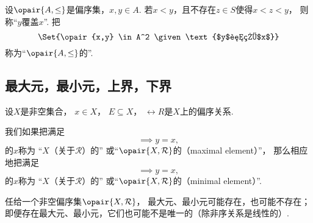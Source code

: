 \begin{definition}
设\(\opair{A,\leq}\)是偏序集，\(x,y \in A\).
若\(x < y\)，且不存在\(z \in S\)使得\(x < z < y\)，
则称“\(y\)覆盖\(x\)”.
把\begin{equation*}
	\Set{\opair{x,y} \in A^2 \given \text{$y$覆盖$x$}}
\end{equation*}称为“\(\opair{A,\leq}\)的”.
\end{definition}

\subsection{最大元，最小元，上界，下界}
\begin{definition}
设\(X\)是非空集合，
\(x \in X\)，
\(E \subseteq X\)，
\(\rel{R}\)是\(X\)上的偏序关系.

我们如果把满足\begin{equation*}
	[y \in X \implies x\rel{R}y]
	\implies
	y = x,
\end{equation*}的\(x\)称为
“\(X\)（关于\(\mathcal{R}\)）的”
或“\(\opair{X,\mathcal{R}}\)的（maximal element）”，
那么相应地把满足\begin{equation*}
	[y \in X \implies y\rel{R}x]
	\implies
	y = x,
\end{equation*}的\(x\)称为
“\(X\)（关于\(\mathcal{R}\)）的”
或“\(\opair{X,\mathcal{R}}\)的（minimal element）”.
\end{definition}

任给一个非空偏序集\(\opair{X,\rel{R}}\)，
最大元、最小元可能存在，也可能不存在；
即便存在最大元、最小元，它们也可能不是唯一的（除非序关系是线性的）.


